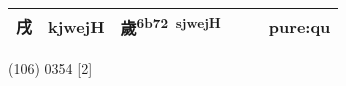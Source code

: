 \documentclass[14pt,a4paper]{scrartcl}
\begin{document}
\begin{longtable}[c]{@{}llllll@{}}
\begin{minipage}[t]{0.14\columnwidth}
戌
\strut\end{minipage} &
\begin{minipage}[t]{0.14\columnwidth}\raggedright\strut
kjwejH
\strut\end{minipage} &
\begin{minipage}[t]{0.14\columnwidth}\raggedright\strut
歲\textsuperscript{6b72~sjwejH}
\strut\end{minipage} &
\begin{minipage}[t]{0.14\columnwidth}\raggedright\strut
\strut\end{minipage} &
\begin{minipage}[t]{0.14\columnwidth}\raggedright\strut
\strut\end{minipage} &
\begin{minipage}[t]{0.14\columnwidth}\raggedright\strut
pure:qu
\strut\end{minipage}\tabularnewline
\bottomrule
\end{longtable}

(106) 0354 {[}2{]}
\end{document}
